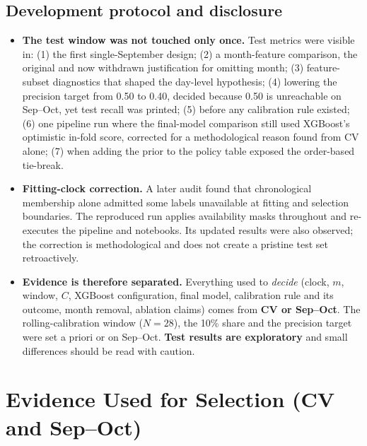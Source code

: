 \documentclass[conference]{IEEEtran}
\begin{document}
\subsection{Development protocol and disclosure}
\begin{itemize}
\item \textbf{The test window was not touched only once.} Test metrics were visible in: (1) the first single-September design; (2) a month-feature comparison, the original and now withdrawn justification for omitting month; (3) feature-subset diagnostics that shaped the day-level hypothesis; (4) lowering the precision target from 0.50 to 0.40, decided because 0.50 is unreachable on Sep--Oct, yet test recall was printed; (5) before any calibration rule existed; (6) one pipeline run where the final-model comparison still used XGBoost's optimistic in-fold score, corrected for a methodological reason found from CV alone; (7) when adding the prior to the policy table exposed the order-based tie-break.
\item \textbf{Fitting-clock correction.} A later audit found that chronological membership alone admitted some labels unavailable at fitting and selection boundaries. The reproduced run applies availability masks throughout and re-executes the pipeline and notebooks. Its updated results were also observed; the correction is methodological and does not create a pristine test set retroactively.
\item \textbf{Evidence is therefore separated.} Everything used to \emph{decide} (clock, $m$, window, $C$, XGBoost configuration, final model, calibration rule and its outcome, month removal, ablation claims) comes from \textbf{CV or Sep--Oct}. The rolling-calibration window ($N=28$), the 10\% share and the precision target were set a priori or on Sep--Oct. \textbf{Test results are exploratory} and small differences should be read with caution.
\end{itemize}

\section{Evidence Used for Selection (CV and Sep--Oct)}\label{sec:selection}
\end{document}
